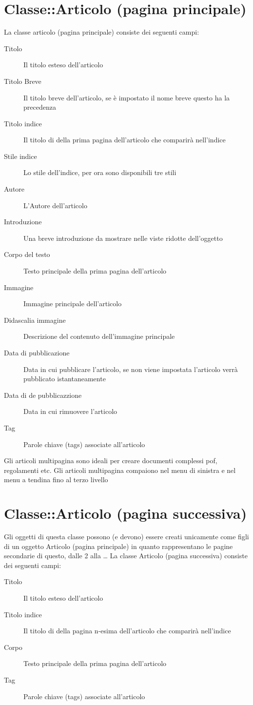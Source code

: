 \section{Classe::Articolo (pagina principale)}
La classe articolo (pagina principale) consiste dei seguenti campi:
\begin{description}
\item[Titolo] Il titolo esteso dell'articolo
\item[Titolo Breve] Il titolo breve dell'articolo, se è impostato il nome breve questo ha la precedenza
\item[Titolo indice] Il titolo di della prima pagina dell'articolo che comparirà nell'indice
\item[Stile indice] Lo stile dell'indice, per ora sono disponibili tre stili
\item[Autore]L'Autore dell'articolo
\item[Introduzione] Una breve introduzione da mostrare nelle viste ridotte dell'oggetto
\item[Corpo del testo] Testo principale della prima pagina dell'articolo
\item[Immagine] Immagine principale dell'articolo
\item[Didascalia immagine] Descrizione del contenuto dell'immagine principale
\item[Data di pubblicazione] Data in cui pubblicare l'articolo, se non viene impostata l'articolo verrà pubblicato istantaneamente
\item[Data di de pubblicazzione] Data in cui rimuovere l'articolo
\item[Tag] Parole chiave (tags) associate all'articolo
\end{description}
Gli articoli multipagina sono ideali per creare documenti complessi  pof, regolamenti etc. Gli articoli multipagina compaiono nel menu di sinistra e nel menu a tendina fino al terzo livello

\section {Classe::Articolo (pagina successiva)}
Gli oggetti di questa classe possono (e devono) essere creati unicamente come figli di un oggetto Articolo (pagina principale) in quanto rappresentano le pagine secondarie di questo, dalle 2 alla \ldots
La classe Articolo (pagina successiva) consiste dei seguenti campi:
\begin{description}
\item[Titolo] Il titolo esteso dell'articolo
\item[Titolo indice] Il titolo di della pagina n-esima dell'articolo che comparirà nell'indice
\item[Corpo] Testo principale della prima pagina dell'articolo
\item[Tag] Parole chiave (tags) associate all'articolo
\end{description}

